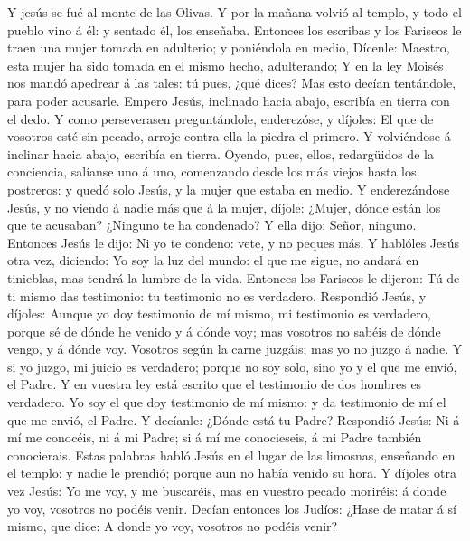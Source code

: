 Y jesús se fué al monte de las Olivas.  Y por
la mañana volvió al templo, y todo el pueblo vino á él: y sentado él,
los enseñaba.  Entonces los escribas y los Fariseos le traen
una mujer tomada en adulterio; y poniéndola en medio, 
Dícenle: Maestro, esta mujer ha sido tomada en el mismo hecho,
adulterando;  Y en la ley Moisés nos mandó apedrear á las
tales: tú pues, ¿qué dices?  Mas esto decían tentándole,
para poder acusarle. Empero Jesús, inclinado hacia abajo, escribía en
tierra con el dedo.  Y como perseverasen preguntándole,
enderezóse, y díjoles: El que de vosotros esté sin pecado, arroje contra
ella la piedra el primero.  Y volviéndose á inclinar hacia
abajo, escribía en tierra.  Oyendo, pues, ellos, redargüidos
de la conciencia, salíanse uno á uno, comenzando desde los más viejos
hasta los postreros: y quedó solo Jesús, y la mujer que estaba en medio.
 Y enderezándose Jesús, y no viendo á nadie más que á la
mujer, díjole: ¿Mujer, dónde están los que te acusaban? ¿Ninguno te ha
condenado?  Y ella dijo: Señor, ninguno. Entonces Jesús le
dijo: Ni yo te condeno: vete, y no peques más.  Y hablóles
Jesús otra vez, diciendo: Yo soy la luz del mundo: el que me sigue, no
andará en tinieblas, mas tendrá la lumbre de la vida. 
Entonces los Fariseos le dijeron: Tú de ti mismo das testimonio: tu
testimonio no es verdadero.  Respondió Jesús, y díjoles:
Aunque yo doy testimonio de mí mismo, mi testimonio es verdadero, porque
sé de dónde he venido y á dónde voy; mas vosotros no sabéis de dónde
vengo, y á dónde voy.  Vosotros según la carne juzgáis; mas
yo no juzgo á nadie.  Y si yo juzgo, mi juicio es
verdadero; porque no soy solo, sino yo y el que me envió, el Padre.
 Y en vuestra ley está escrito que el testimonio de dos
hombres es verdadero.  Yo soy el que doy testimonio de mí
mismo: y da testimonio de mí el que me envió, el Padre.  Y
decíanle: ¿Dónde está tu Padre? Respondió Jesús: Ni á mí me conocéis, ni
á mi Padre; si á mí me conocieseis, á mi Padre también conocierais.
 Estas palabras habló Jesús en el lugar de las limosnas,
enseñando en el templo: y nadie le prendió; porque aun no había venido
su hora.  Y díjoles otra vez Jesús: Yo me voy, y me
buscaréis, mas en vuestro pecado moriréis: á donde yo voy, vosotros no
podéis venir.  Decían entonces los Judíos: ¿Hase de matar á
sí mismo, que dice: A donde yo voy, vosotros no podéis venir?
